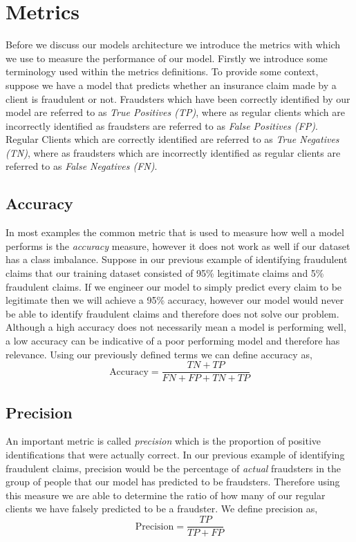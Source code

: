 \section{Metrics}
Before we discuss our models architecture we introduce the metrics with which we use to measure the performance of our model. Firstly we introduce some terminology used within the metrics definitions. To provide some context, suppose we have a model that predicts whether an insurance claim made by a client is fraudulent or not. Fraudsters which have been correctly identified by our model are referred to as \emph{True Positives (TP)}, where as regular clients which are incorrectly identified as fraudsters are referred to as \emph{False Positives (FP)}. Regular Clients which are correctly identified are referred to as \emph{True Negatives (TN)}, where as fraudsters which are incorrectly identified as regular clients are referred to as \emph{False Negatives (FN)}.
\subsection{Accuracy}
 In most examples the common metric that is used to measure how well a model performs is the \emph{accuracy} measure, however it does not work as well if our dataset has a class imbalance. Suppose in our previous example of identifying fraudulent claims that our training dataset consisted of 95\% legitimate claims and 5\% fraudulent claims. If we engineer our model to simply predict every claim to be legitimate then we will achieve a 95\% accuracy, however our model would never be able to identify fraudulent claims and therefore does not solve our problem. Although a high accuracy does not necessarily mean a model is performing well, a low accuracy can be indicative of a poor performing model and therefore has relevance. Using our previously defined terms we can define accuracy as,
\begin{equation}
    \mbox{Accuracy} = \frac{TN + TP}{FN + FP + TN + TP}
\end{equation}
\subsection{Precision}
An important metric is called \emph{precision} which is the proportion of positive identifications that were actually correct. In our previous example of identifying fraudulent claims, precision would be the percentage of \emph{actual} fraudsters in the group of people that our model has predicted to be fraudsters. Therefore using this measure we are able to determine the ratio of how many of our regular clients we have falsely predicted to be a fraudster. We define precision as,
\begin{equation}
    \mbox{Precision} = \frac{TP}{TP + FP}
\end{equation}
